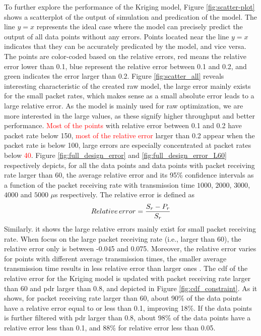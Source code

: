 To further explore the performance of the Kriging model, Figure \ref{fig:scatter-plot}  shows a scatterplot of the output of simulation and predication of the model.
The line  $y=x$ represents the ideal case where the model can precisely predict the output of all data points without any errors. Points located near the line $y=x$ indicates that they can be accurately predicated by the model, and vice versa. The points are color-coded based on the relative errors, red means the relative error lower than 0.1, blue represent the relative error between 0.1 and 0.2, and green indicates the error larger than 0.2. Figure \ref{fig:scatter_all} reveals interesting characteristic of the created \gls{raw} model, the large error mainly exists for the small packet rates, which makes sense as a small absolute error leads to a large relative error. As the model is mainly used for \gls{raw} optimization, we are more interested in the large values, as these signify higher throughput and better performance. \textcolor{red}{Most of the points} with relative error between 0.1 and 0.2 have packet rate below 150, \textcolor{red}{most of the relative error} larger than 0.2 appear when the packet rate is below 100, large errors are especially concentrated at packet rates below \textcolor{red}{40}. Figure \ref{fig:full_design_error} and \ref{fig:full_design_error_L60} respectively depicts, for all the data points and data points with packet receiving rate larger than 60, the average relative error and its 95\% confidence intervals as a function of the packet receiving rate with transmission time $1000$, $2000$, $3000$, $4000$ and $5000$ $\mu$s respectively. The relative error is defined as 
\begin{equation}
Relative \thinspace error = \frac{{S_r - P_r} }{S_r} 
\end{equation}
Similarly. it shows the large relative errors mainly exist for small packet receiving rate. When focus on the large packet receiving rate (i.e., larger than 60), the relative error only is between -0.045 and 0.075. Moreover, the relative error varies for points with different average transmission times, the smaller average transmission time results in less relative error than larger ones . The \gls{cdf} of the relative error for the Kriging model is updated with packet receiving rate larger than 60 and \gls{pdr} larger than 0.8, and depicted in Figure \ref{fig:cdf_constraint}. As it shows, for packet receiving rate larger than 60, about 90\% of the data points have a relative error equal to or less than 0.1, improving 18\%. If the data points is further filtered with \gls{pdr} larger than 0.8, about 98\% of the data points have a relative error less than 0.1, and 88\% for relative error less than 0.05.



